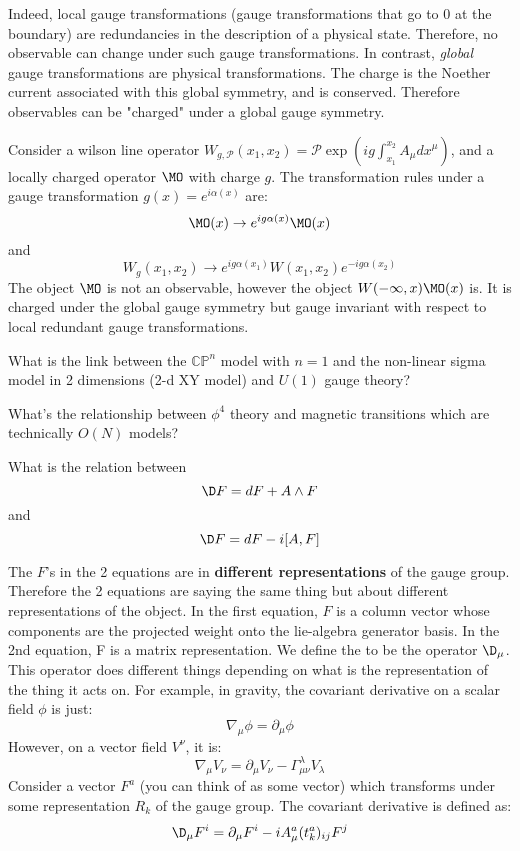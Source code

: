 \documentclass[11pt]{scrartcl}
\begin{document}
Indeed, local gauge transformations (gauge transformations that go to 0 at the boundary) are redundancies in the description of a physical state.  Therefore, no observable can change under such gauge transformations.
\newline
In contrast, \emph{global} gauge transformations are physical transformations.  The charge is the Noether current associated with this global symmetry, and is conserved.  Therefore observables can be "charged" under a global gauge symmetry.

\begin{example}
	Consider a wilson line operator $W_{g, \mathcal{P}}(x_1, x_2) = \mathcal{P} \exp( i g \int_{x_1}^{x_2} A_\mu dx^\mu)$, and a locally charged operator $\MO$ with charge $g$.
	The transformation rules under a gauge transformation $g(x) = e^{i \alpha(x)}$ are:
	\[ \MO(x) \rightarrow e^{i g \alpha(x)} \MO(x) \]
	and 
	\[ W_{g}(x_1, x_2) \rightarrow e^{i g \alpha(x_1)} W(x_1, x_2) e^{- i g \alpha(x_2)}\]
	The object $\MO$ is not an observable, however the object
	$ W(-\infty, x) \MO(x)$ is.  It is charged under the global gauge symmetry but gauge invariant with respect to local redundant gauge transformations.
	\end{example}

\begin{myquestion}
	What is the link between the $\mathbb{CP}^n$ model with $n=1$ and the non-linear sigma model in 2 dimensions (2-d XY model) and $U(1)$ gauge theory?
	\end{myquestion}


\begin{myquestion}
	What's the relationship between $\phi^4$ theory and magnetic transitions which are technically $O(N)$ models?
\end{myquestion}


\begin{myquestion}
	What is the relation between \[ \D F = dF + A \wedge F \] and \[ \D F = dF - i [A, F] \]
	\end{myquestion}
	The $F$'s in the 2 equations are in \textbf{different representations} of the gauge group.  Therefore the 2 equations are saying the same thing but about different representations of the object.
	\newline
	In the first equation, $F$ is a column vector whose components are the projected weight onto the lie-algebra generator basis.  In the 2nd equation, F is a matrix representation.
	\newline
	We define the  to be the operator $\D_\mu$.  This operator does different things depending on what is the representation of the thing it acts on.  For example, in gravity, the covariant derivative on a scalar field $\phi$ is just:
	\[ \nabla_\mu \phi = \partial_\mu \phi \]
	However, on a vector field $V^\nu$, it is:
	\[ \nabla_\mu V_\nu = \partial_\mu V_\nu - \Gamma^{\lambda}_{\mu \nu} V_\lambda \]
	\newline
	Consider a vector $F^a$ (you can think of as some vector) which transforms under some representation $R_{k}$ of the gauge group.  The covariant derivative is defined as:
	\[ \D_\mu F^i = \partial_\mu F^i - i A_\mu^a(t_k^a)_{ij} F^j \]
	
\end{document}
